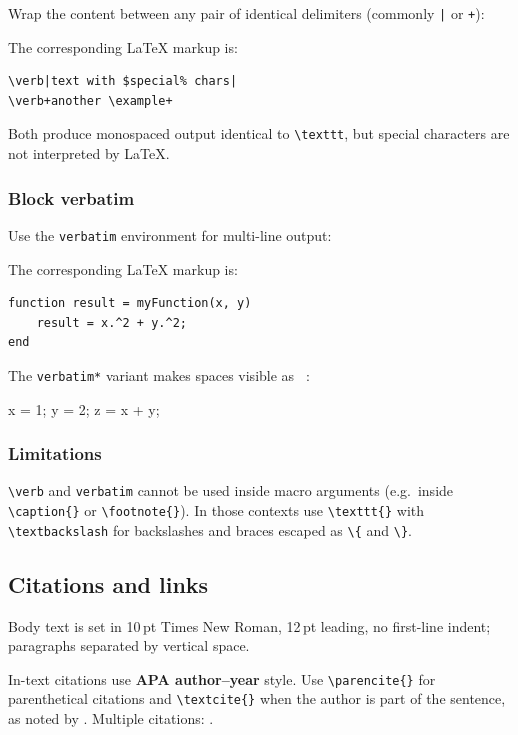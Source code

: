 \documentclass{wpom-upv}
\begin{document}
Wrap the content between any pair of identical delimiters (commonly
\texttt{|} or \texttt{+}):

The corresponding \LaTeX{} markup is:

\begin{verbatim}
\verb|text with $special% chars|
\verb+another \example+
\end{verbatim}

Both produce monospaced output identical to \verb|\texttt|, but special
characters are not interpreted by \LaTeX{}.

\subsubsection{Block verbatim}

Use the \texttt{verbatim} environment for multi-line output:

The corresponding \LaTeX{} markup is:

\begin{verbatim}
function result = myFunction(x, y)
    result = x.^2 + y.^2;
end
\end{verbatim}

\noindent The \texttt{verbatim*} variant makes spaces visible as
\verb*| |:

\begin{verbatim*}
x = 1;   y = 2;   z = x + y;
\end{verbatim*}

\subsubsection{Limitations}

\verb|\verb| and \texttt{verbatim} cannot be used inside macro
arguments (e.g.\ inside \verb|\caption{}| or \verb|\footnote{}|). In
those contexts use \verb|\texttt{}| with \verb|\textbackslash| for
backslashes and braces escaped as \verb|\{| and \verb|\}|.

\subsection{Citations and links}

Body text is set in 10\,pt Times New Roman, 12\,pt leading, no
first-line indent; paragraphs separated by vertical space.

In-text citations use \textbf{APA author--year} style.
Use \verb|\parencite{}| for parenthetical citations
\parencite{maringarcia2021three} and \verb|\textcite{}| when the author is
part of the sentence, as noted by \textcite{maringarcia2022case}.
Multiple citations: \parencite{maringarcia2021three,maringarcia2021teaching}.
\end{document}
